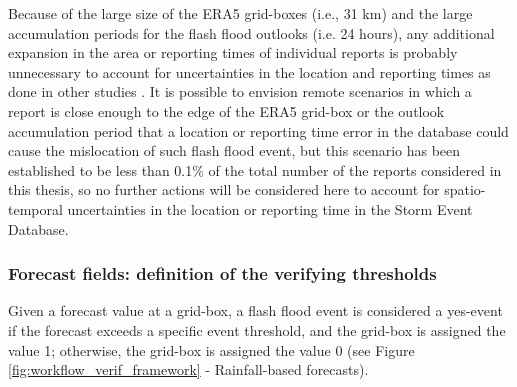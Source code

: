 Because of the large size of the ERA5 grid-boxes (i.e., 31 km) and the large accumulation periods for the flash flood outlooks (i.e. 24 hours), any additional expansion in the area or reporting times of individual reports is probably unnecessary to account for uncertainties in the location and reporting times as done in other studies \citep{Cavaiola_2024}. It is possible to envision remote scenarios in which a report is close enough to the edge of the ERA5 grid-box or the outlook accumulation period that a location or reporting time error in the database could cause the mislocation of such flash flood event, but this scenario has been established to be less than 0.1\% of the total number of the reports considered in this thesis, so no further actions will be considered here to account for spatio-temporal uncertainties in the location or reporting time in the Storm Event Database. 


\subsubsection{Forecast fields: definition of the verifying thresholds}

Given a forecast value at a grid-box, a flash flood event is considered a yes-event if the forecast exceeds a specific event threshold, and the grid-box is assigned the value 1; otherwise, the grid-box is assigned the value 0 (see Figure \ref{fig:workflow_verif_framework} - Rainfall-based forecasts).

